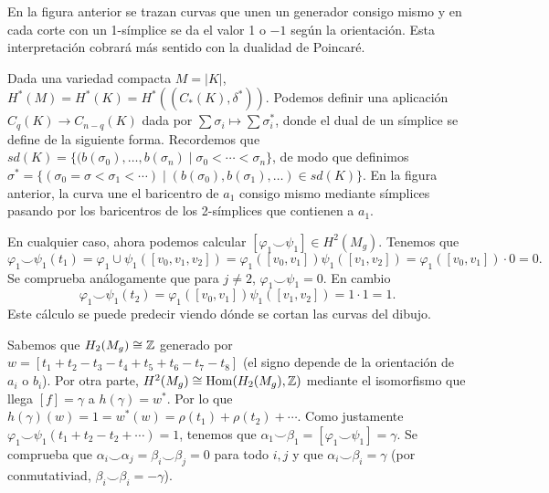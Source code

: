 \documentclass[TA.tex]{subfiles}
\begin{document}
\begin{ej}
En la figura anterior se trazan curvas que unen un generador consigo mismo y en cada corte con un 1-símplice se da el valor 1 o $-1$ según la orientación. Esta interpretación cobrará más sentido con la dualidad de Poincaré.

Dada una variedad compacta $M=|K|$, $H^*(M)=H^*(K)=H^*((C_*(K),\delta^*))$. Podemos definir una aplicación $C_q(K)\to C_{n-q}(K)$ dada por $\sum\sigma_i\mapsto \sum\sigma_i^*$, donde el dual de un símplice se define de la siguiente forma. Recordemos que $sd(K)=\{(b(\sigma_0),\dots, b(\sigma_n)\mid \sigma_0<\cdots<\sigma_n\}$, de modo que definimos $\sigma^*=\{(\sigma_0=\sigma<\sigma_1<\cdots)\mid (b(\sigma_0),b(\sigma_1),\dots)\in sd(K)\}$. En la figura anterior, la curva une el baricentro de $a_1$ consigo mismo mediante símplices pasando por los baricentros de los 2-símplices que contienen a $a_1$.  


En cualquier caso, ahora podemos calcular $[\varphi_1\smile \psi_1]\in H^2(M_g)$. Tenemos que $$\varphi_1\smile\psi_1(t_1)=\varphi_1\cup\psi_1([v_0,v_1,v_2])=\varphi_1([v_0,v_1])\psi_1([v_1,v_2])=\varphi_1([v_0,v_1])\cdot 0=0.$$ Se comprueba análogamente que para $j\neq 2$, $\varphi_1\smile \psi_1=0$. En cambio $$\varphi_1\smile\psi_1(t_2)=\varphi_1([v_0,v_1])\psi_1([v_1,v_2])=1\cdot 1=1.$$ Este cálculo se puede predecir viendo dónde se cortan las curvas del dibujo.

 Sabemos que $H_2(M_g)\cong\mathbb{Z}$ generado por $w=[t_1+t_2-t_3-t_4+t_5+t_6-t_7-t_8]$ (el signo depende de la orientación de $a_i$ o $b_i$). Por otra parte, $H^2(M_g)\cong \operatorname{Hom}(H_2(M_g),\mathbb{Z})$ mediante el isomorfismo  que llega $[f]=\gamma$ a $h(\gamma)=w^*$. Por lo que $h(\gamma)(w)=1=w^*(w)=\rho(t_1)+\rho(t_2)+\cdots$. Como justamente $\varphi_1\smile\psi_1(t_1+t_2-t_2+\cdots)=1$, tenemos que $\alpha_1\smile\beta
 _1=[\varphi_1\smile\psi_1]=\gamma$. Se comprueba que $\alpha_i\smile\alpha_j=\beta_i\smile\beta_j=0$ para todo $i,j$ y que $\alpha_i\smile\beta_i=\gamma$ (por conmutativiad, $\beta_i\smile\beta_i=-\gamma$). 


\end{ej}
\end{document}
